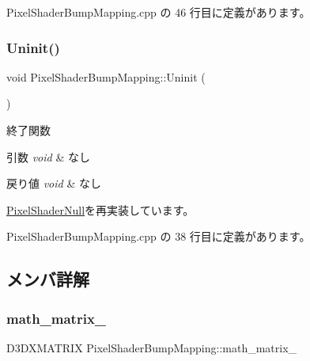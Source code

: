  Pixel\+Shader\+Bump\+Mapping.\+cpp の 46 行目に定義があります。

\mbox{\label{class_pixel_shader_bump_mapping_a004f731db6dab6b59949baed4a5a32d7}} 
\subsubsection{\texorpdfstring{Uninit()}{Uninit()}}
{\footnotesize\ttfamily void Pixel\+Shader\+Bump\+Mapping\+::\+Uninit (\begin{DoxyParamCaption}{ }\end{DoxyParamCaption})\hspace{0.3cm}{\ttfamily [virtual]}}



終了関数 


\begin{DoxyParams}{引数}
{\em void} & なし \\
\hline
\end{DoxyParams}

\begin{DoxyRetVals}{戻り値}
{\em void} & なし \\
\hline
\end{DoxyRetVals}


\mbox{\hyperlink{class_pixel_shader_null_adca4c44cd25c90a5ebd75b459f5e641e}{Pixel\+Shader\+Null}}を再実装しています。



 Pixel\+Shader\+Bump\+Mapping.\+cpp の 38 行目に定義があります。



\subsection{メンバ詳解}
\mbox{\label{class_pixel_shader_bump_mapping_a3c24357ac9611761eece892054847c83}} 
\subsubsection{\texorpdfstring{math\+\_\+matrix\+\_\+}{math\_matrix\_}}
{\footnotesize\ttfamily D3\+D\+X\+M\+A\+T\+R\+IX Pixel\+Shader\+Bump\+Mapping\+::math\+\_\+matrix\+\_\+\hspace{0.3cm}{\ttfamily [private]}}



